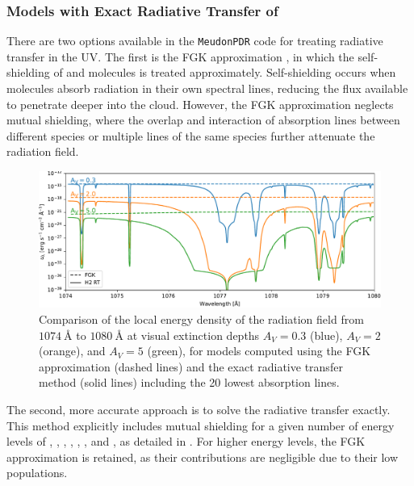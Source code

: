 \documentclass[12pt,a4paper]{article}
\newcommand{\mdpdr}{\texttt{MeudonPDR} code}
\begin{document}
\subsubsection{Models with Exact Radiative Transfer of \texorpdfstring{}{H2}} \label{sec:exactrt}

There are two options available in the \mdpdr{} for treating radiative transfer in the UV. The first is the FGK approximation \parencite{Federman1979}, in which the self-shielding of  and  molecules is treated approximately. Self-shielding occurs when molecules absorb radiation in their own spectral lines, reducing the flux available to penetrate deeper into the cloud. However, the FGK approximation neglects mutual shielding, where the overlap and interaction of absorption lines between different species or multiple lines of the same species further attenuate the radiation field.

\begin{figure}[ht]
    \centering
    \includegraphics[width=.92\textwidth,keepaspectratio]{spectra_fgkh2_1.pdf}
    \caption{Comparison of the local energy density of the radiation field from $1074~\text{\AA}$ to $1080~\text{\AA}$ at visual extinction depths $A_V = 0.3$ (blue), $A_V = 2$ (orange), and $A_V = 5$ (green), for models computed using the FGK approximation (dashed lines) and the exact radiative transfer method (solid lines) including the 20 lowest  absorption lines.} \label{fig:cmpH2rtspectra}
\end{figure}

The second, more accurate approach is to solve the radiative transfer exactly. This method explicitly includes mutual shielding for a given number of energy levels of , , , , , , and , as detailed in \textcite{Goicoechea2007,Gonzalez2008}. For higher energy levels, the FGK approximation is retained, as their contributions are negligible due to their low populations.
\end{document}
